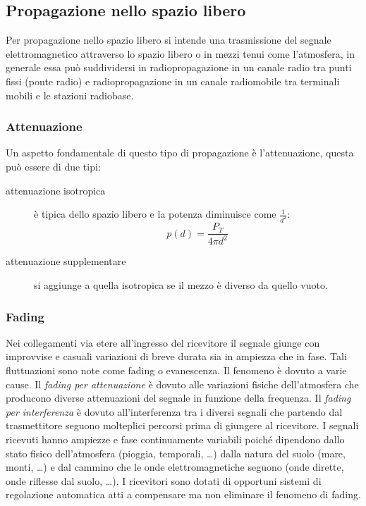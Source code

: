 \subsection{Propagazione nello spazio libero}
Per propagazione nello spazio libero si intende una trasmissione del segnale elettromagnetico attraverso lo spazio libero o in mezzi 
tenui come l'atmosfera, in generale essa può suddividersi in radiopropagazione in un canale radio tra punti fissi (ponte radio) e 
radiopropagazione in un canale radiomobile tra terminali mobili e le stazioni radiobase. \\

\subsubsection{Attenuazione}
Un aspetto fondamentale di questo tipo di propagazione è l'attenuazione, questa può essere di due tipi:
\begin{description}
\item[attenuazione isotropica] è tipica dello spazio libero e la potenza diminuisce come $\frac{1}{d^{2}}$: \\
\[
p(d)=\frac{P_{T}}{4 \pi d^{2}}
\]
\item[attenuazione supplementare] si aggiunge a quella isotropica se il mezzo è diverso da quello vuoto.
\end{description}

\subsubsection{Fading} 
Nei collegamenti via etere all'ingresso del ricevitore il segnale giunge con improvvise e casuali variazioni di breve durata sia in 
ampiezza che in fase. Tali fluttuazioni sono note come fading o evanescenza. Il fenomeno è dovuto a varie cause.
Il \emph{fading per attenuazione} è dovuto alle variazioni fisiche dell'atmosfera che producono diverse attenuazioni del segnale in 
funzione della frequenza.
Il \emph{fading per interferenza} è dovuto all'interferenza tra i diversi segnali che partendo dal trasmettitore seguono molteplici 
percorsi prima di giungere al ricevitore. I segnali ricevuti hanno ampiezze e fase continuamente variabili poiché dipendono dallo 
stato fisico dell'atmosfera (pioggia, temporali, \ldots) dalla natura del suolo (mare, monti, \ldots) e dal cammino che le onde
elettromagnetiche seguono (onde dirette, onde riflesse dal suolo, \ldots).
I ricevitori sono dotati di opportuni sistemi di regolazione automatica atti a compensare ma non eliminare il fenomeno di fading.

